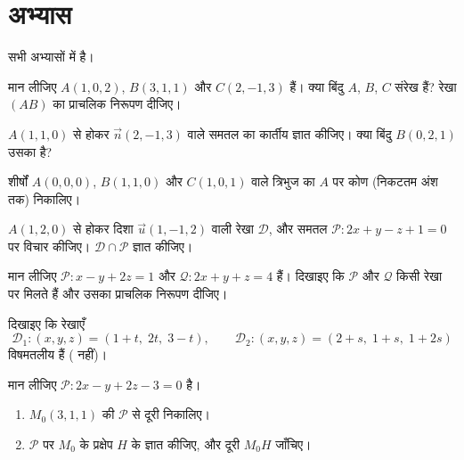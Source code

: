 \section{अभ्यास}

सभी अभ्यासों में   है।

\begin{exercise}[$\star$]\label{exo:g12:space:1}
मान लीजिए $A(1, 0, 2)$, $B(3, 1, 1)$ और $C(2, -1, 3)$ हैं। क्या बिंदु $A$, $B$, $C$ संरेख
हैं? रेखा $(AB)$ का प्राचलिक निरूपण दीजिए।
\end{exercise}

\begin{exercise}[$\star$]\label{exo:g12:space:2}
$A(1, 1, 0)$ से होकर  $\vec n(2, -1, 3)$ वाले समतल का कार्तीय  ज्ञात कीजिए। क्या
बिंदु $B(0, 2, 1)$ उसका है?
\end{exercise}

\begin{exercise}[$\star$]\label{exo:g12:space:3}
शीर्षों $A(0,0,0)$, $B(1, 1, 0)$ और $C(1, 0, 1)$ वाले त्रिभुज का $A$ पर कोण (निकटतम अंश तक)
निकालिए।
\end{exercise}

\begin{exercise}[$\star\star$]\label{exo:g12:space:4}
$A(1, 2, 0)$ से होकर दिशा $\vec u(1, -1, 2)$ वाली रेखा $\mathcal D$, और समतल $\mathcal P : 2x + y - z + 1 = 0$ पर विचार कीजिए।
$\mathcal D \cap \mathcal P$ ज्ञात कीजिए।
\end{exercise}

\begin{exercise}[$\star\star$]\label{exo:g12:space:5}
मान लीजिए $\mathcal P : x - y + 2z = 1$ और $\mathcal Q : 2x + y + z = 4$ हैं। दिखाइए कि $\mathcal P$ और $\mathcal Q$ किसी रेखा पर मिलते
हैं और उसका प्राचलिक निरूपण दीजिए।
\end{exercise}

\begin{exercise}[$\star\star$]\label{exo:g12:space:6}
दिखाइए कि रेखाएँ
\[
\mathcal D_1 : (x, y, z) = (1 + t,\; 2t,\; 3 - t), \qquad
\mathcal D_2 : (x, y, z) = (2 + s,\; 1 + s,\; 1 + 2s)
\]
विषमतलीय हैं ( नहीं)।
\end{exercise}

\begin{exercise}[$\star\star$]\label{exo:g12:space:7}
मान लीजिए $\mathcal P : 2x - y + 2z - 3 = 0$ है।
\begin{enumerate}
  \item $M_0(3, 1, 1)$ की $\mathcal P$ से दूरी निकालिए।
  \item $\mathcal P$ पर $M_0$ के  प्रक्षेप $H$ के  ज्ञात कीजिए,
        और दूरी $M_0H$ जाँचिए।
\end{enumerate}
\end{exercise}

